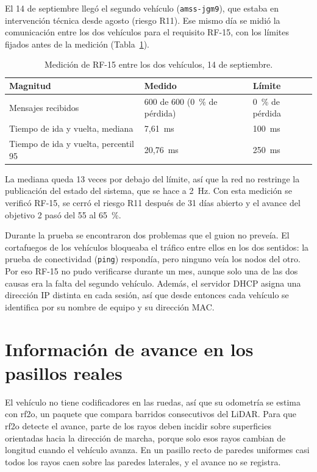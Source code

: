 \documentclass[12pt,letterpaper]{article}
\begin{document}
El 14 de septiembre llegó el segundo vehículo (\texttt{amss-jgm9}), que estaba en intervención técnica desde agosto (riesgo R11). Ese mismo día se midió la comunicación entre los dos vehículos para el requisito RF-15, con los límites fijados antes de la medición (Tabla~\ref{tab:rf15}).

\begin{table}[H]
    \centering
    \small
    \caption{Medición de RF-15 entre los dos vehículos, 14 de septiembre.}
    \label{tab:rf15}
    \begin{tabular}{@{}p{5.6cm}p{4.4cm}p{3.6cm}@{}}
        \toprule
        \textbf{Magnitud} & \textbf{Medido} & \textbf{Límite} \\ \midrule
        Mensajes recibidos & 600 de 600 (0~\% de pérdida) & 0~\% de pérdida \\ \addlinespace
        Tiempo de ida y vuelta, mediana & 7,61~ms & 100~ms \\ \addlinespace
        Tiempo de ida y vuelta, percentil 95 & 20,76~ms & 250~ms \\ \bottomrule
    \end{tabular}
\end{table}

La mediana queda 13 veces por debajo del límite, así que la red no restringe la publicación del estado del sistema, que se hace a 2~Hz. Con esta medición se verificó RF-15, se cerró el riesgo R11 después de 31 días abierto y el avance del objetivo 2 pasó del 55 al 65~\%.

Durante la prueba se encontraron dos problemas que el guion no preveía. El cortafuegos de los vehículos bloqueaba el tráfico entre ellos en los dos sentidos: la prueba de conectividad (\texttt{ping}) respondía, pero ninguno veía los nodos del otro. Por eso RF-15 no pudo verificarse durante un mes, aunque solo una de las dos causas era la falta del segundo vehículo. Además, el servidor DHCP asigna una dirección IP distinta en cada sesión, así que desde entonces cada vehículo se identifica por su nombre de equipo y su dirección MAC.

\section{Información de avance en los pasillos reales}
\label{sec:pisos}

El vehículo no tiene codificadores en las ruedas, así que su odometría se estima con rf2o, un paquete que compara barridos consecutivos del LiDAR. Para que rf2o detecte el avance, parte de los rayos deben incidir sobre superficies orientadas hacia la dirección de marcha, porque solo esos rayos cambian de longitud cuando el vehículo avanza. En un pasillo recto de paredes uniformes casi todos los rayos caen sobre las paredes laterales, y el avance no se registra.
\end{document}
